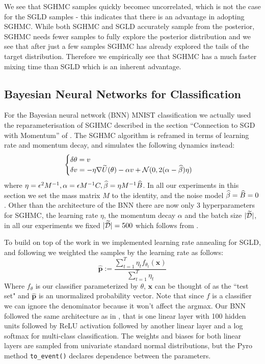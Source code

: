 We see that SGHMC samples quickly becomec uncorrelated, which is not the case for the SGLD samples - this indicates that there is an advantage in adopting SGHMC. While both SGHMC and SGLD accurately sample from the posterior, SGHMC needs fewer samples to fully explore the posterior distribution and we see that after just a few samples SGHMC has already explored the tails of the target distribution. Therefore we empirically see that SGHMC has a much faster mixing time than SGLD which is an inherent advantage.

\subsection{Bayesian Neural Networks for Classification}
For the Bayesian neural network (BNN) MNIST classification we actually used the reparameterisation of SGHMC described in the section ``Connection to SGD with Momentum'' of \cite{sghmc}. The SGHMC algorithm is reframed in terms of learning rate and momentum decay, and simulates the following dynamics instead:
$$\begin{cases}
\delta \theta = v\\
\delta v = - \eta \nabla \widetilde{U}(\theta) - \alpha v + \mathcal{N}(0, 2(\alpha - \widehat{\beta}) \eta)
\end{cases}
$$
where $\eta = \epsilon^2 M^{-1}, \alpha = \epsilon M^{-1}C, \widehat{\beta} = \eta M^{-1}\widehat{B}$. In all our experiments in this section we set the mass matrix $M $ to the identity, and the noise model $\widehat{\beta} = \widehat{B} = 0$. Other than the architecture of the BNN there are now only 3 hyperparameters for SGHMC, the learning rate $\eta$, the momentum decay $\alpha$ and the batch size $|\widetilde{\mathcal{D}}|$, in all our experiments we fixed $|\widetilde{\mathcal{D}}| = 500$ which follows from \cite{sghmc}.

To build on top of the work in \cite{sghmc} we implemented learning rate annealing for SGLD, and following \cite{sgld} we weighted the samples by the learning rate as follows:
$$\mathbf{\hat p} := \frac{\sum^T_{t=1} \eta_t f_{\theta_t}(\textbf{x})}{\sum^T_{t=1} \eta_t}$$
Where $f_\theta$ is our classifier parameterized by $\theta$, $\mathbf{x}$ can be thought of as the ``test set" and $\mathbf{\hat p}$ is an unormalized probability vector. Note that since $f$ is a classifier we can ignore the denominator because it won't affect the argmax. Our BNN followed the same architecture as in \cite{sghmc}, that is one linear layer with 100 hidden units followed by ReLU activation followed by another linear layer and a log softmax for multi-class classification. The weights and biases for both linear layers are sampled from univariate standard normal distributions, but the Pyro method \texttt{to\_event()} declares dependence between the parameters. 

